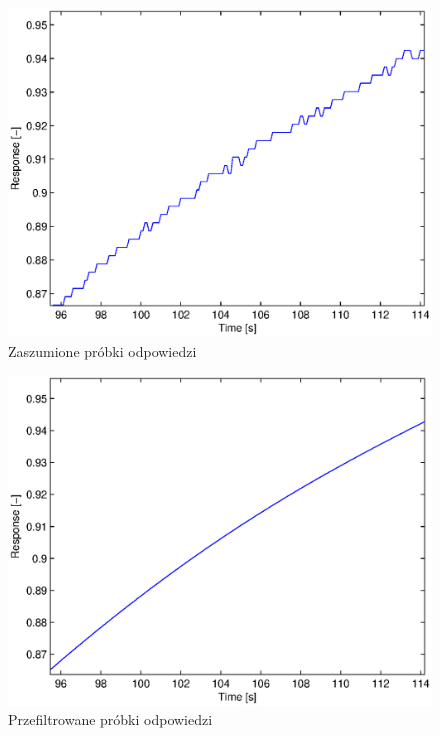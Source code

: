 \documentclass[12pt]{article}
\begin{document}
\newpage

\begin{figure}[!htp]
	\begin{center}
		\includegraphics[width=13cm]{../res/img/szum.eps}
	\end{center}
	\caption{Zaszumione próbki odpowiedzi}
\end{figure}

\begin{figure}[!htp]
	\begin{center}
		\includegraphics[width=13cm]{../res/img/szumless.eps}
	\end{center} 
	\caption{Przefiltrowane próbki odpowiedzi}
\end{figure}
\end{document}
